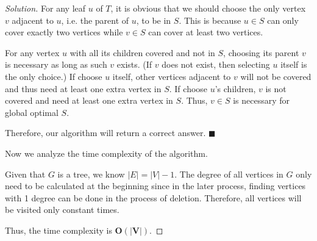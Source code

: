 \documentclass{article}
\renewcommand{\qedsymbol}{\hfill $\blacksquare$\par}
\newenvironment{solution}{\begin{proof}[\noindent\it Solution]}{\end{proof}}
\begin{document}
\begin{solution}
    \hspace{2.6em}
    For any leaf $u$ of $T$, it is obvious that we should choose the only vertex $v$ adjacent to $u$, i.e. the parent of $u$, to be in $S$. This is because $u\in S$ can only cover exactly two vertices while $v\in S$ can cover at least two vertices.
    
    \hspace{2.6em}
    For any vertex $u$ with all its children covered and not in $S$, choosing its parent $v$ is necessary as long as such $v$ exists. (If $v$ does not exist, then selecting $u$ itself is the only choice.) If choose $u$ itself, other vertices adjacent to $v$ will not be covered and thus need at least one extra vertex in $S$. If choose $u$'s children, $v$ is not covered and need at least one extra vertex in $S$. Thus, $v\in S$ is necessary for global optimal $S$.
    
    \hspace{2.6em}
    Therefore, our algorithm will return a correct answer. \qedsymbol
    
    \newpage \hspace{2.6em}
    Now we analyze the time complexity of the algorithm.
    
    \hspace{2.6em}
    Given that $G$ is a tree, we know $|E|=|V|-1$. The degree of all vertices in $G$ only need to be calculated at the beginning since in the later process, finding vertices with 1 degree can be done in the process of deletion. Therefore, all vertices will be visited only constant times.
    
    \hspace{2.6em}
    Thus, the time complexity is \underline{$\boldsymbol{O(|V|)}$}.
\end{solution}

\vspace{1em}
\end{document}
